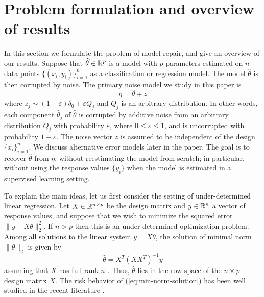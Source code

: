 \let\epsilon\varepsilon
\def\point#1{\vskip10pt\noindent{\it\bfseries #1.}\enspace}
\def\L{{\mathcal L}}

\section{Problem formulation and overview of results}
\label{sec:overview}

In this section we formulate the problem of model repair, and give an overview of our results. Suppose that $\widehat\theta \in \mathbb{R}^p$ is a model with $p$ parameters estimated on $n$ data points $\{(x_i, y_i)\}_{i=1}^n$ as a classification or regression model. The model $\hat\theta$ is then corrupted by noise. The primary noise model we study in this paper is
\begin{equation}
  \eta = \hat\theta + z
\end{equation}
where $z_j \sim (1-\epsilon) \delta_0 + \epsilon Q_j$ and $Q_j$ is an arbitrary distribution. In other words, each component $\hat\theta_j$ of $\hat\theta$ is corrupted by additive noise from an arbitrary distribution $Q_j$ with probability $\epsilon$, where $0\leq \epsilon \leq 1$, and is uncorrupted with probability $1-\epsilon$. The noise vector $z$ is assumed to be independent of the design $\{x_i\}_{i=1}^n$. We discuss alternative error models later in the paper. The goal is to recover $\hat\theta$ from $\eta$, without reestimating the model from scratch; in particular, without using the response values $\{y_i\}$ when the model is estimated in a supervised learning setting.

\point{Overparameterized linear models}
To explain the main ideas, let us first consider the setting of under-determined linear regression. Let $X\in\mathbb{R}^{n\times p}$ be the design matrix and $y\in\mathbb{R}^n$ a vector of response values, and suppose that we wish to minimize the squared error  $\|y-X\theta\|_2^2$. If $n > p$ then this is an under-determined optimization problem. Among all solutions to the linear system $y = X\theta$, the solution of minimal norm $\|\theta\|_2$ is given by
\begin{equation}
  \hat \theta = X^T (X X^T)^{-1} y \label{eq:min-norm-solution}
\end{equation}
assuming that $X$ has full rank $n$ \citep{boyd:04}. Thus, $\hat\theta$ lies in the row space of the $n\times p$ design matrix $X$. The risk behavior of (\ref{eq:min-norm-solution}) has been well studied in the recent literature \citep{belkin2019two,hastie2019surprises,bartlett2020benign}.

